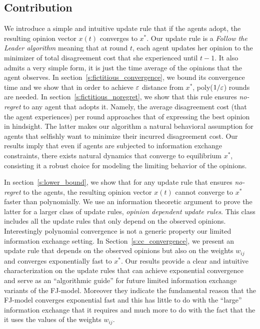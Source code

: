 \subsection{Contribution}
We introduce a simple and intuitive update rule that if the agents adopt,
the resulting opinion vector $x(t)$ converges to $x^*$.
Our update rule is a \emph{Follow the Leader algorithm}
meaning that at round $t$, each agent updates her opinion
to the minimizer of total disagreement cost that
she experienced until $t-1$. It also admits a very simple form,
it is just the time average of the opinions that the agent observes.
In section~\ref{s:fictitious_convergence},
we bound its convergence time and we show that in order
to achieve $\varepsilon$ distance from $x^*$, poly($1/\varepsilon$) rounds
are needed. In section~\ref{s:fictitious_noregret},
we show that this rule ensures \emph{no-regret} to any agent
that adopts it. Namely, the average disagreement cost (that
the agent experiences) per round approaches that
of expressing the best opinion in hindsight. The latter
makes our algorithm a natural behavioral assumption for
agents that selfishly want to minimize their incurred disagreement cost.
Our results imply that even if agents are subjected to
information exchange constraints, there exists natural
dynamics that converge to equilibrium $x^*$, consisting it
a robust choice for modeling the limiting behavior of the opinions.

In section~\ref{s:lower_bound}, we show
that for any update rule that ensures \emph{no-regret}
to the agents, the resulting opinion vector $x(t)$
cannot converge to $x^*$ faster than polynomially.
We use an information theoretic argument to prove
the latter for a larger class of update rules,
\emph{opinion dependent update rules}. This class includes
all the update rules that only depend on the observed
opinions. Interestingly polynomial convergence is not a
generic property our limited information exchange setting.
In Section~\ref{s:cc_convergence}, we present an update rule
that depends on the observed opinions but also on the weights
$w_{ij}$ and converges exponentially fast to $x^*$. Our results
provide a clear and intuitive characterization on the update
rules that can achieve exponential convergence and serve as
an \enquote{algorithmic guide} for future limited information exchange
variants of the FJ-model. Moreover they indicate the fundamental reason that
the FJ-model converges exponential fast and this has little
to do with the \enquote{large} information exchange
that it requires and much more to do with the fact that
the it uses the values of the weights $w_{ij}$.

